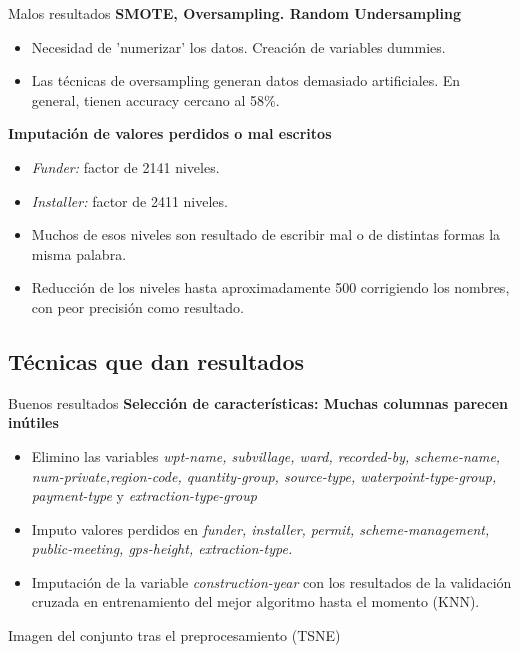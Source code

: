 \begin{frame}{Malos resultados}
	\textbf{SMOTE, Oversampling. Random Undersampling}
	\begin{itemize}
		\item Necesidad de 'numerizar' los datos. Creación de variables dummies. \pause
		\item Las técnicas de oversampling generan datos demasiado artificiales. En general, tienen accuracy cercano al 58\%.
	\end{itemize}
	\textbf{Imputación de valores perdidos o mal escritos} \pause
	\begin{itemize}
		\item \textit{Funder:} factor de 2141 niveles.
		\item \textit{Installer:} factor de 2411 niveles. 
		\item Muchos de esos niveles son resultado de escribir mal o de distintas formas la misma palabra.
		\item Reducción de los niveles hasta aproximadamente 500 corrigiendo los nombres, con peor precisión como resultado.
	\end{itemize}
\end{frame}

\subsection{Técnicas que dan resultados}

\begin{frame}{Buenos resultados}
	\textbf{Selección de características: Muchas columnas parecen inútiles}
	\begin{itemize}
		\item Elimino las variables \textit{wpt-name, subvillage, ward, recorded-by, scheme-name, num-private,region-code, quantity-group, source-type, waterpoint-type-group, payment-type} y \textit{extraction-type-group}
		\item Imputo valores perdidos en \textit{funder, installer, permit, scheme-management, public-meeting, gps-height, extraction-type.}
		\item Imputación de la variable \textit{construction-year} con los resultados de la validación cruzada en entrenamiento del mejor algoritmo hasta el momento (KNN).
	\end{itemize}
\end{frame}


\begin{frame}{Imagen del conjunto tras el preprocesamiento (TSNE)}
	
\end{frame}

